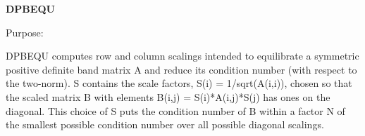 {\bfseries D\+P\+B\+E\+Q\+U} 

 \begin{DoxyParagraph}{Purpose\+: }
\begin{DoxyVerb} DPBEQU computes row and column scalings intended to equilibrate a
 symmetric positive definite band matrix A and reduce its condition
 number (with respect to the two-norm).  S contains the scale factors,
 S(i) = 1/sqrt(A(i,i)), chosen so that the scaled matrix B with
 elements B(i,j) = S(i)*A(i,j)*S(j) has ones on the diagonal.  This
 choice of S puts the condition number of B within a factor N of the
 smallest possible condition number over all possible diagonal
 scalings.\end{DoxyVerb}
 
\end{DoxyParagraph}

